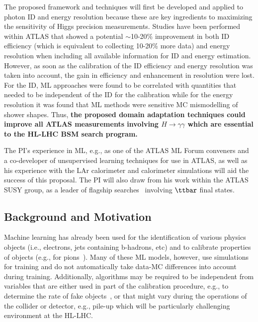\documentclass[letter, USenglish, 11pt, subfigure]{article}
\begin{document}
The proposed framework and techniques will first be developed and applied to photon ID and energy resolution because these are key ingredients to maximizing the sensitivity of Higgs precision measurements. Studies have been performed within ATLAS that showed a potential $\sim$10-20\% improvement in both ID efficiency (which is equivalent to collecting 10-20\% more data) and energy resolution when including all available information for ID and energy estimation. However, as soon as the calibration of the ID efficiency and energy resolution was taken into account, the gain in efficiency and enhancement in resolution were lost. For the ID, ML approaches were found to be correlated with quantities that needed to be independent of the ID for the calibration while for the energy resolution it was found that ML methods were sensitive MC mismodelling of shower shapes. Thus, {\bf the proposed domain adaptation techniques could improve all ATLAS measurements involving $H\to\gamma\gamma$ which are essential to the HL-LHC BSM search program.}

The PI's experience in ML, e.g., as one of the ATLAS ML Forum conveners and a co-developer of unsupervised learning techniques for use in ATLAS, as well as his experience with the LAr calorimeter and calorimeter simulations will aid the success of this proposal. The PI will also draw from his work within the ATLAS SUSY group, as a leader of flagship searches~\cite{stop0L_1,stopRun1,stop0L_2,stop0L_3} involving $\ttbar$ final states. %


\subsection{Background and Motivation}

Machine learning has already been used for the identification of various physics objects (i.e., electrons, jets containing b-hadrons, etc) and to calibrate properties of objects (e.g., for pions~\cite{ATL-PHYS-PUB-2020-018}). Many of these ML models, however, use simulations for training and do not automatically take data-MC differences into account during training. Additionally, algorithms may be required to be independent from variables that are either used in part of the calibration procedure, e.g., to determine the rate of fake objects~\cite{atlas_photon_id}, or that might vary during the operations of the collider or detector, e.g., pile-up which will be particularly challenging environment at the HL-LHC.
\end{document}
